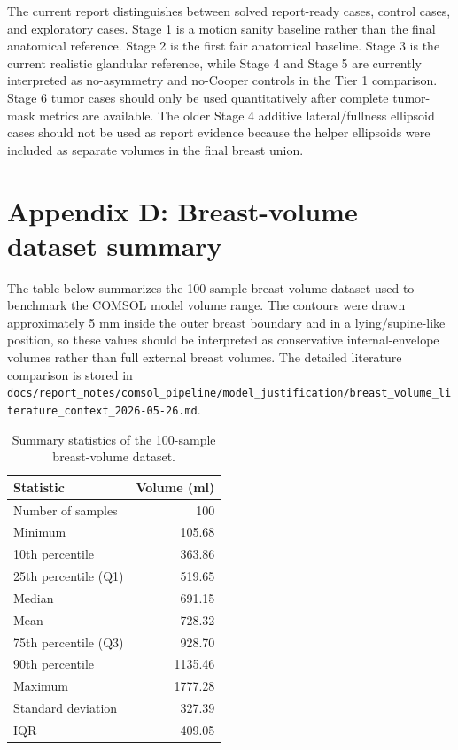 The current report distinguishes between solved report-ready cases, control cases, and exploratory cases. Stage 1 is a motion sanity baseline rather than the final anatomical reference. Stage 2 is the first fair anatomical baseline. Stage 3 is the current realistic glandular reference, while Stage 4 and Stage 5 are currently interpreted as no-asymmetry and no-Cooper controls in the Tier 1 comparison. Stage 6 tumor cases should only be used quantitatively after complete tumor-mask metrics are available. The older Stage 4 additive lateral/fullness ellipsoid cases should not be used as report evidence because the helper ellipsoids were included as separate volumes in the final breast union.

\section*{Appendix D: Breast-volume dataset summary}
\label{sec:appendix_volume_summary}

The table below summarizes the 100-sample breast-volume dataset used to benchmark the COMSOL model volume range. The contours were drawn approximately 5 mm inside the outer breast boundary and in a lying/supine-like position, so these values should be interpreted as conservative internal-envelope volumes rather than full external breast volumes. The detailed literature comparison is stored in \texttt{docs/report\_notes/comsol\_pipeline/model\_justification/breast\_volume\_literature\_context\_2026-05-26.md}.

\begin{table}[H]
\centering
\caption{Summary statistics of the 100-sample breast-volume dataset.}
\label{tab:appendix_breast_volume_dataset}
\begin{tabular}{lr}
\hline
Statistic & Volume (ml) \\
\hline
Number of samples & 100 \\
Minimum & 105.68 \\
10th percentile & 363.86 \\
25th percentile (Q1) & 519.65 \\
Median & 691.15 \\
Mean & 728.32 \\
75th percentile (Q3) & 928.70 \\
90th percentile & 1135.46 \\
Maximum & 1777.28 \\
Standard deviation & 327.39 \\
IQR & 409.05 \\
\hline
\end{tabular}
\end{table}

